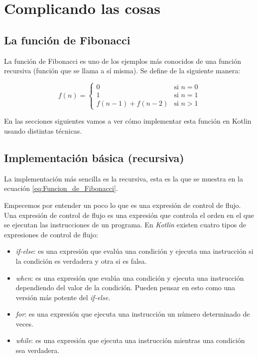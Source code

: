 \section{Complicando las cosas}
  \label{sec:Complicando_las_cosas}

  \subsection{La función de Fibonacci}
    \label{subsec:La_funcion_de_Fibonacci}

    La función de Fibonacci es uno de los ejemplos más conocidos de una función recursiva (función 
    que se llama a sí misma). 
    Se define de la siguiente manera:

    \begin{equation}
      \label{eq:Funcion_de_Fibonacci}
      f(n) = \begin{cases}
        0 & \text{si } n = 0 \\
        1 & \text{si } n = 1 \\
        f(n - 1) + f(n - 2) & \text{si } n > 1
      \end{cases}
    \end{equation}

    En las secciones siguientes vamos a ver cómo implementar esta función en Kotlin usando distintas
    técnicas.

    \subsection{Implementación básica (recursiva)}
      La implementación más sencilla es la recursiva, esta es la que se muestra en la ecuación
      \ref{eq:Funcion_de_Fibonacci}.

      Empecemos por entender un poco lo que es una expresión de control de flujo.
      Una expresión de control de flujo es una expresión que controla el orden en el que se ejecutan
      las instrucciones de un programa.
      En \textit{Kotlin} existen cuatro tipos de expresiones de control de flujo:

      \begin{itemize}
        \item \textit{if-else}: es una expresión que evalúa una condición y ejecuta una instrucción
          si la condición es verdadera y otra si es falsa.
        \item \textit{when}: es una expresión que evalúa una condición y ejecuta una instrucción
          dependiendo del valor de la condición.
          Pueden pensar en esto como una versión más potente del \textit{if-else}.
        \item \textit{for}: es una expresión que ejecuta una instrucción un número determinado de
          veces.
        \item \textit{while}: es una expresión que ejecuta una instrucción mientras una condición
          sea verdadera.
      \end{itemize}

